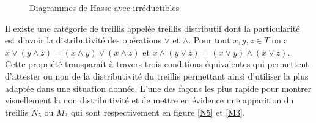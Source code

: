 \begin{figure}[H]
	\begin{minipage}{0.5\textwidth}
	\begin{center}
	\end{center}
	\end{minipage}
	\begin{minipage}{0.5\textwidth}
	\begin{center}
	\end{center}
	\end{minipage}
	\caption{Diagrammes de Hasse avec irréductibles}
	\label{hasse_irr}
\end{figure}

Il existe une catégorie de treillis appelée treillis distributif dont la particularité est d'avoir la distributivité des opérations $\vee$ et $\wedge$. Pour tout $x, y, z \in T$ on a $x \vee (y \wedge z) = (x \wedge y) \vee (x \wedge z)$ et $x \wedge (y \vee z) = (x\vee y) \wedge (x \vee z)$. Cette propriété transparait à travers trois conditions équivalentes qui permettent d'attester ou non de la distributivité du treillis permettant ainsi d'utiliser la plus adaptée dans une situation donnée. L'une des façons les plus rapide pour montrer visuellement la non distributivité et de mettre en évidence une apparition du treillis $N_5$ ou $M_3$ qui sont respectivement en figure \ref{N5} et \ref{M3}.

